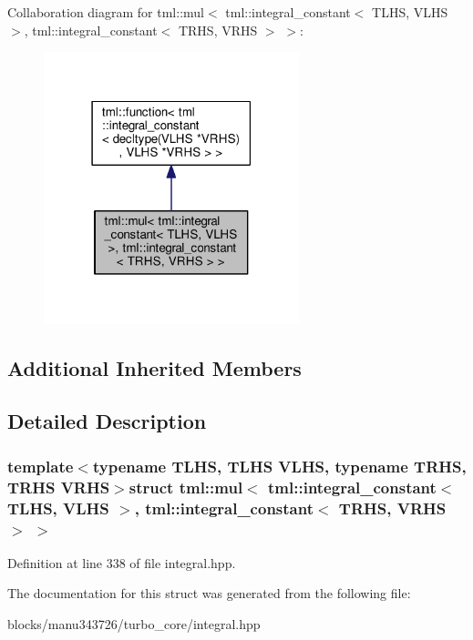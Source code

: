 Collaboration diagram for tml\+:\+:mul$<$ tml\+:\+:integral\+\_\+constant$<$ T\+L\+H\+S, V\+L\+H\+S $>$, tml\+:\+:integral\+\_\+constant$<$ T\+R\+H\+S, V\+R\+H\+S $>$ $>$\+:
\nopagebreak
\begin{figure}[H]
\begin{center}
\leavevmode
\includegraphics[width=210pt]{structtml_1_1mul_3_01tml_1_1integral__constant_3_01_t_l_h_s_00_01_v_l_h_s_01_4_00_01tml_1_1integ1208c877242aede94f4bbed35ba2a9da}
\end{center}
\end{figure}
\subsection*{Additional Inherited Members}


\subsection{Detailed Description}
\subsubsection*{template$<$typename T\+L\+H\+S, T\+L\+H\+S V\+L\+H\+S, typename T\+R\+H\+S, T\+R\+H\+S V\+R\+H\+S$>$struct tml\+::mul$<$ tml\+::integral\+\_\+constant$<$ T\+L\+H\+S, V\+L\+H\+S $>$, tml\+::integral\+\_\+constant$<$ T\+R\+H\+S, V\+R\+H\+S $>$ $>$}



Definition at line 338 of file integral.\+hpp.



The documentation for this struct was generated from the following file\+:\begin{DoxyCompactItemize}
\item 
blocks/manu343726/turbo\+\_\+core/integral.\+hpp\end{DoxyCompactItemize}
